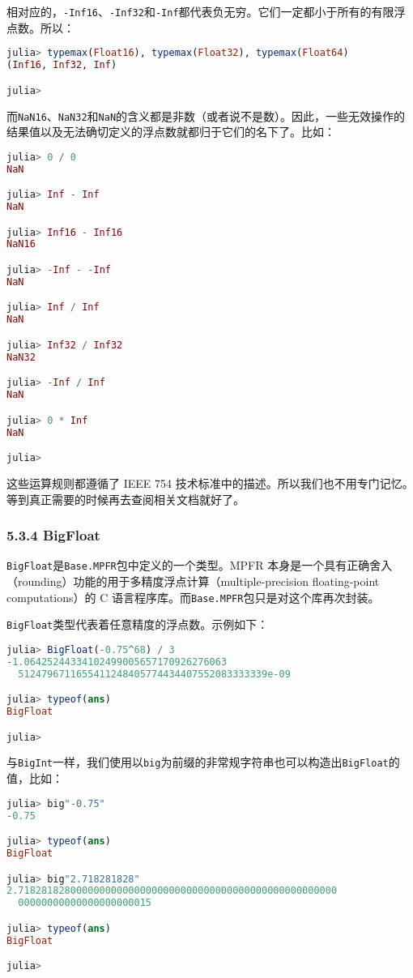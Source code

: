 相对应的，\verb`-Inf16`、\verb`-Inf32`和\verb`-Inf`都代表负无穷。它们一定都小于所有的有限浮点数。所以：
\begin{lstlisting}[language=julia]
julia> typemax(Float16), typemax(Float32), typemax(Float64)
(Inf16, Inf32, Inf)

julia> 
\end{lstlisting}

而\verb`NaN16`、\verb`NaN32`和\verb`NaN`的含义都是非数（或者说不是数）。因此，一些无效操作的结果值以及无法确切定义的浮点数就都归于它们的名下了。比如：
\begin{lstlisting}[language=julia]
julia> 0 / 0
NaN

julia> Inf - Inf
NaN

julia> Inf16 - Inf16
NaN16

julia> -Inf - -Inf
NaN

julia> Inf / Inf
NaN

julia> Inf32 / Inf32
NaN32

julia> -Inf / Inf
NaN

julia> 0 * Inf
NaN

julia> 
\end{lstlisting}

这些运算规则都遵循了 IEEE 754 技术标准中的描述。所以我们也不用专门记忆。等到真正需要的时候再去查阅相关文档就好了。

\subsubsection{5.3.4 BigFloat}

\verb`BigFloat`是\verb`Base.MPFR`包中定义的一个类型。MPFR 本身是一个具有正确舍入（rounding）功能的用于多精度浮点计算（multiple-precision floating-point computations）的 C 语言程序库。而\verb`Base.MPFR`包只是对这个库再次封装。

\verb`BigFloat`类型代表着任意精度的浮点数。示例如下：
\begin{lstlisting}[language=julia]
julia> BigFloat(-0.75^68) / 3
-1.06425244334102499005657170926276063
  5124796711655411248405774434407552083333339e-09

julia> typeof(ans)
BigFloat

julia> 
\end{lstlisting}

与\verb`BigInt`一样，我们使用以\verb`big`为前缀的非常规字符串也可以构造出\verb`BigFloat`的值，比如：
\begin{lstlisting}[language=julia]
julia> big"-0.75"
-0.75

julia> typeof(ans)
BigFloat

julia> big"2.718281828"
2.7182818280000000000000000000000000000000000000000000000
  00000000000000000000015

julia> typeof(ans)
BigFloat

julia> 
\end{lstlisting}

